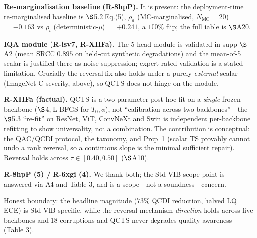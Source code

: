 \textbf{Re-marginalisation baseline (R-8hpP).} It is present: the deployment-time re-marginalised baseline is $\S$5.2 Eq.(5), $\rho_a$ (MC-marginalised, $N_{\mathrm{MC}}{=}20$) $=-0.163$ vs $\rho_b$ (deterministic-$\mu$) $=+0.241$, a $100\%$ flip; the full table is $\S$A20.

\textbf{IQA module (R-isv7, R-XHFa).} The 5-head module is validated in supp $\S$A2 (mean SRCC $0.895$ on held-out synthetic degradations) and the mean-of-5 scalar is justified there as noise suppression; expert-rated validation is a stated limitation. Crucially the reversal-fix also holds under a purely \emph{external} scalar (ImageNet-C severity, above), so QCTS does not hinge on the module.

\textbf{R-XHFa (factual).} QCTS is a two-parameter post-hoc fit on a \emph{single} frozen backbone ($\S$4, L-BFGS for $T_0,\alpha$), not ``calibration across two backbones''---the $\S$5.3 ``re-fit'' on ResNet, ViT, ConvNeXt and Swin is independent per-backbone refitting to show universality, not a combination. The contribution is conceptual: the QAC/QCDI protocol, the taxonomy, and Prop~1 (scalar TS provably cannot undo a rank reversal, so a continuous slope is the minimal sufficient repair). Reversal holds across $\tau\in[0.40,0.50]$ ($\S$A10).

\textbf{R-8hpP (5) / R-6xgi (4).} We thank both; the Std VIB scope point is answered via A4 and Table 3, and is a scope---not a soundness---concern.

Honest boundary: the headline magnitude ($73\%$ QCDI reduction, halved LQ ECE) is Std-VIB-specific, while the reversal-mechanism \emph{direction} holds across five backbones and 18 corruptions and QCTS never degrades quality-awareness (Table 3).
